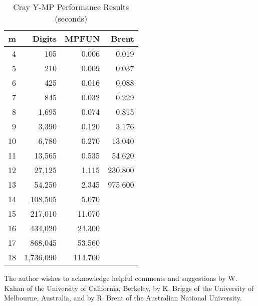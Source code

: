 \begin{table}[p] \begin{center} \begin{tabular}{|r|r|r|r|}
\hline
 m  & Digits  &   MPFUN   &  Brent \\
\hline
 4  &       105 &     0.006 &      0.019 \\
 5  &       210 &     0.009 &      0.037 \\
 6  &       425 &     0.016 &      0.088 \\
 7  &       845 &     0.032 &      0.229 \\
 8  &     1,695 &     0.074 &      0.815 \\
 9  &     3,390 &     0.120 &      3.176 \\
10  &     6,780 &     0.270 &     13.040 \\
11  &    13,565 &     0.535 &     54.620 \\
12  &    27,125 &     1.115 &    230.800 \\
13  &    54,250 &     2.345 &    975.600 \\
14  &   108,505 &     5.070 &             \\
15  &   217,010 &    11.070 &             \\
16  &   434,020 &    24.300 &             \\
17  &   868,045 &    53.560 &             \\
18  & 1,736,090 &   114.700 &             \\
\hline
\end{tabular}
\caption{Cray Y-MP Performance Results (seconds)}
\end{center} \end{table}

\vspace{2ex}

The author wishes to acknowledge helpful comments and suggestions by
W. Kahan of the University of California, Berkeley, by K. Briggs of
the University of Melbourne, Australia, and by R. Brent of the
Australian National University.

\newpage

